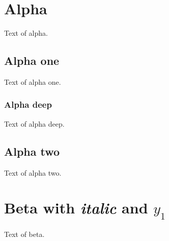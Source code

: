 \documentclass{article}
\begin{document}
\tableofcontents
\section{Alpha}
Text of alpha.
\subsection{Alpha one}
Text of alpha one.
\subsubsection{Alpha deep}
Text of alpha deep.
\subsection{Alpha two}
Text of alpha two.
\section{Beta with \emph{italic} and $y_1$}
Text of beta.
\end{document}
